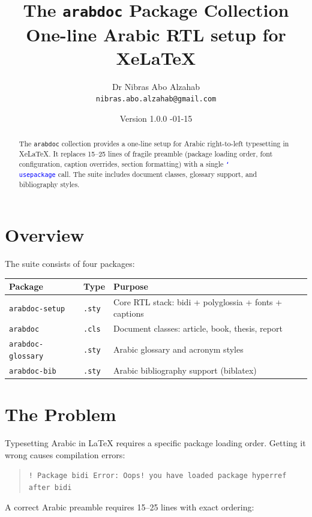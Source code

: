\documentclass[11pt,a4paper]{ltxdoc}
\title{The \texttt{arabdoc} Package Collection\\[0.3em]
\large One-line Arabic RTL setup for XeLaTeX}
\author{Dr Nibras Abo Alzahab\\\texttt{nibras.abo.alzahab@gmail.com}}
\date{\textenglish{Version 1.0.0 \quad 2025-01-15}}
\newcommand{\cmd}[1]{\textcolor{blue}{\texttt{\char`\\#1}}}
\newcommand{\pkg}[1]{\texttt{#1}}
\begin{document}
\maketitle

\begin{abstract}
\noindent
The \pkg{arabdoc} collection provides a one-line setup for Arabic right-to-left typesetting in XeLaTeX. It replaces 15--25 lines of fragile preamble (package loading order, font configuration, caption overrides, section formatting) with a single \cmd{usepackage} call. The suite includes document classes, glossary support, and bibliography styles.
\end{abstract}

\tableofcontents

\section{Overview}

The suite consists of four packages:

\begin{longtable}{lll}
\toprule
\textbf{Package} & \textbf{Type} & \textbf{Purpose} \\
\midrule
\pkg{arabdoc-setup} & \texttt{.sty} & Core RTL stack: bidi + polyglossia + fonts + captions \\
\pkg{arabdoc} & \texttt{.cls} & Document classes: article, book, thesis, report \\
\pkg{arabdoc-glossary} & \texttt{.sty} & Arabic glossary and acronym styles \\
\pkg{arabdoc-bib} & \texttt{.sty} & Arabic bibliography support (biblatex) \\
\bottomrule
\end{longtable}

\section{The Problem}

Typesetting Arabic in LaTeX requires a specific package loading order. Getting it wrong causes compilation errors:

\begin{quote}
\texttt{! Package bidi Error: Oops! you have loaded package hyperref after bidi}
\end{quote}

A correct Arabic preamble requires 15--25 lines with exact ordering:
\end{document}
